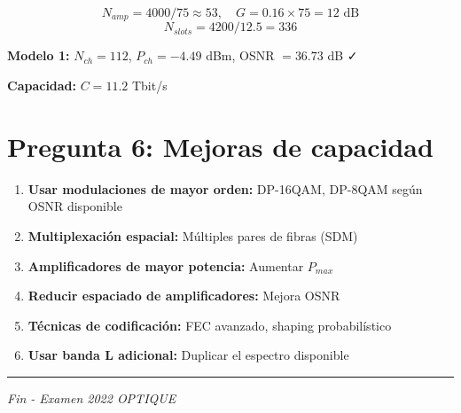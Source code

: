 \documentclass[a4paper,11pt]{article}
\begin{document}
$$N_{amp} = 4000/75 \approx 53, \quad G = 0.16 \times 75 = 12 \text{ dB}$$
$$N_{slots} = 4200/12.5 = 336$$

\textbf{Modelo 1:} $N_{ch} = 112$, $P_{ch} = -4.49$ dBm, OSNR $= 36.73$ dB ✓

\textbf{Capacidad:} $C = 11.2$ Tbit/s

\section*{Pregunta 6: Mejoras de capacidad}

\begin{enumerate}
    \item \textbf{Usar modulaciones de mayor orden:} DP-16QAM, DP-8QAM según OSNR disponible
    \item \textbf{Multiplexación espacial:} Múltiples pares de fibras (SDM)
    \item \textbf{Amplificadores de mayor potencia:} Aumentar $P_{max}$
    \item \textbf{Reducir espaciado de amplificadores:} Mejora OSNR
    \item \textbf{Técnicas de codificación:} FEC avanzado, shaping probabilístico
    \item \textbf{Usar banda L adicional:} Duplicar el espectro disponible
\end{enumerate}

\vspace{1cm}
\noindent\rule{\textwidth}{0.4pt}
\begin{center}
\textit{Fin - Examen 2022 OPTIQUE}
\end{center}
\end{document}
